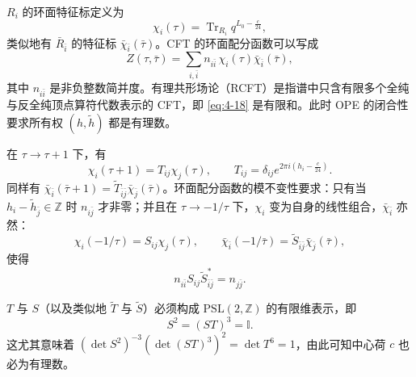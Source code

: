 $R_i$ 的环面特征标定义为
\begin{equation}
  \label{eq:4-17}
  \chi_i(\tau)=\operatorname{Tr}_{R_i}q^{L_0-\frac{c}{24}},
\end{equation}
类似地有 $\bar R_{\bar i}$ 的特征标 $\bar\chi_{\bar i}(\bar\tau)$。CFT 的环面配分函数可以写成
\begin{equation}
  \label{eq:4-18}
  Z(\tau,\bar\tau)=\sum_{i,\bar i}n_{i\bar i}\,\chi_i(\tau)\bar\chi_{\bar i}(\bar\tau),
\end{equation}
其中 $n_{i\bar i}$ 是非负整数简并度。有理共形场论（RCFT）是指谱中只含有限多个全纯与反全纯顶点算符代数表示的 CFT，即 \eqref{eq:4-18} 是有限和。此时 OPE 的闭合性要求所有权 $(h,\tilde h)$ 都是有理数。

在 $\tau\to\tau+1$ 下，有
\begin{equation}
  \label{eq:4-19}
  \chi_i(\tau+1)=T_{ij}\chi_j(\tau),\qquad T_{ij}=\delta_{ij}e^{2\pi i\left(h_i-\frac{c}{24}\right)}.
\end{equation}
同样有 $\bar\chi_{\bar i}(\bar\tau+1)=\tilde T_{\bar i\bar j}\bar\chi_{\bar j}(\bar\tau)$。环面配分函数的模不变性要求：只有当 $h_i-\tilde h_{\bar j}\in\mathbb{Z}$ 时 $n_{i\bar j}$ 才非零；并且在 $\tau\to-1/\tau$ 下，$\chi_i$ 变为自身的线性组合，$\bar\chi_{\bar i}$ 亦然：
\begin{equation}
  \label{eq:4-20}
  \chi_i(-1/\tau)=S_{ij}\chi_j(\tau),\qquad \bar\chi_{\bar i}(-1/\bar\tau)=\tilde S_{\bar i\bar j}\bar\chi_{\bar j}(\bar\tau),
\end{equation}
使得
\begin{equation}
  \label{eq:4-21}
  n_{i\bar i}S_{ij}\tilde S^*_{\bar i\bar j}=n_{j\bar j}.
\end{equation}


$T$ 与 $S$（以及类似地 $\tilde T$ 与 $\tilde S$）必须构成 $\mathrm{PSL}(2,\mathbb{Z})$ 的有限维表示，即
\begin{equation}
  \label{eq:4-22}
  S^2=(ST)^3=\mathbb{I}.
\end{equation}
这尤其意味着 $(\det S^2)^{-3}(\det(ST)^3)^2=\det T^6=1$，由此可知中心荷 $c$ 也必为有理数。


